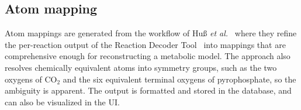 \subsection{Atom mapping}\label{sec:methods-mapping}

Atom mappings are generated from the workflow of Hu{\ss} \textit{et al.}~\cite{huss2022} where they refine the per-reaction output of the Reaction Decoder Tool~\cite{rahman2016} into mappings that are comprehensive enough for reconstructing a metabolic model.
The approach also resolves chemically equivalent atoms into symmetry groups, such as the two oxygens of CO$_2$ and the six equivalent terminal oxygens of pyrophosphate, so the ambiguity is apparent.
The output is formatted and stored in the database, and can also be visualized in the UI.
